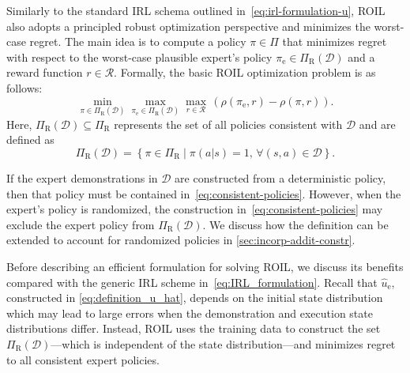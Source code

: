 Similarly to the standard IRL schema outlined in~\eqref{eq:irl-formulation-u}, ROIL also adopts a principled robust optimization perspective and minimizes the worst-case regret.  The main idea is to compute a policy $\pi\in \Pi$ that minimizes regret with respect to the worst-case plausible expert's policy $\pi_{\mathrm{e}} \in \Pi_{\mathrm{R}}(\mathcal{D})$ and a reward function $r\in \mathcal{R}$. Formally, the basic ROIL optimization problem is as follows:
\begin{equation}
\label{eq:robust_IRL_formulation}
\min_{\pi \in \Pi_{\mathrm{R}}(\mathcal{D})}  \max_{\pi_{\mathrm{e}} \in \Pi_{\mathrm{R}}(\mathcal{D})} \max_{r \in \mathcal{R}} \,
\left(\rho(\pi_{\mathrm{e}}, r) - \rho(\pi, r)\right).
\end{equation}
Here, $ \Pi_{\mathrm{R}}(\mathcal{D}) \subseteq \Pi_{\mathrm{R}}$ represents the set of all policies consistent with $\mathcal{D}$ and are defined as 
%
\begin{equation} \label{eq:consistent-policies}
\Pi_{\mathrm{R}}(\mathcal{D}) = \left\{ \pi \in \Pi_{\mathrm{R}} \mid \pi(a|s) = 1, \, \forall (s,a) \in \mathcal{D} \right\}.
\end{equation}

If the expert demonstrations in $\mathcal{D}$ are constructed from a deterministic policy, then that policy must be contained in~\eqref{eq:consistent-policies}. However, when the expert's policy is randomized, the construction in~\eqref{eq:consistent-policies} may exclude the expert policy from $\Pi_{\mathrm{R}}(\mathcal{D})$. We discuss how the definition can be extended to account for randomized policies in \cref{sec:incorp-addit-constr}. 

Before describing an efficient formulation for solving ROIL, we discuss its benefits compared with the generic IRL scheme in~\eqref{eq:IRL_formulation}. Recall that $\hat{u}_{\mathrm{e}}$, constructed in \eqref{eq:definition_u_hat},  depends on the initial state distribution which may lead to large errors when the demonstration and execution state distributions differ. Instead, ROIL uses the training data to construct the set $\Pi_{\mathrm{R}}(\mathcal{D})$---which is independent of the state distribution---and minimizes regret to all consistent expert policies. 

